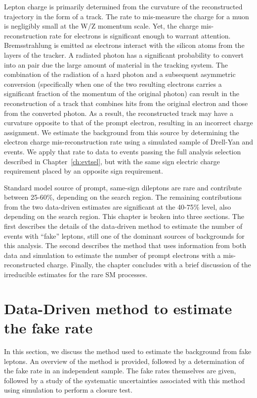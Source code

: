 Lepton charge is primarily determined from the curvature of the reconstructed
trajectory in the form of a track. The rate to mis-measure the charge for
a muon is negligibly small at the W/Z momentum scale. Yet, the charge
mis-reconstruction rate for electrons is significant enough to warrant
attention. Bremsstrahlung is emitted as electrons interact with the silicon
atoms from the layers of the tracker. A radiated photon has a significant
probability to convert into an \epem pair due the large amount of material
in the tracking system. The combination of the radiation of a hard photon and
a subsequent asymmetric conversion (specifically when one of the two
resulting electrons carries a significant fraction of the momentum of the
original photon) can result in the reconstruction of a track that combines
hits from the original electron and those from the converted photon. As
a result, the reconstructed track may have a curvature opposite to that
of the prompt electron, resulting in an incorrect charge assignment. We
estimate the background from this source by determining the electron charge
mis-reconstruction rate using a simulated sample of Drell-Yan and \ttbar
events. We apply that rate to data to events passing the full analysis
selection described in Chapter~\ref{ch:evtsel}, but with the same sign electric
charge requirement placed by an opposite sign requirement.

Standard model source of prompt, same-sign dileptons are rare and contribute
between 25-60\%, depending on the search region. The remaining contributions
from the two data-driven estimates are significant at the 40-75\% level, also
depending on the search region. This chapter is broken into three sections.
The first describes the details of the data-driven method to estimate the
number of events with ``fake'' leptons, still one of the dominant sources
of backgrounds for this analysis. The second describes the method that uses
information from both data and simulation to estimate the number of prompt
electrons with a mis-reconstructed charge. Finally, the chapter concludes with
a brief discussion of the irreducible estimates for the rare SM processes.

\section{Data-Driven method to estimate the fake rate}
\label {sec:bkgd_fakes}
In this section, we discuss the method used to estimate the background
from fake leptons. An overview of the method is provided, followed by a
determination of the fake rate in an independent sample. The fake rates
themselves are given, followed by a study of the systematic uncertainties
associated with this method using simulation to perform a closure test.

